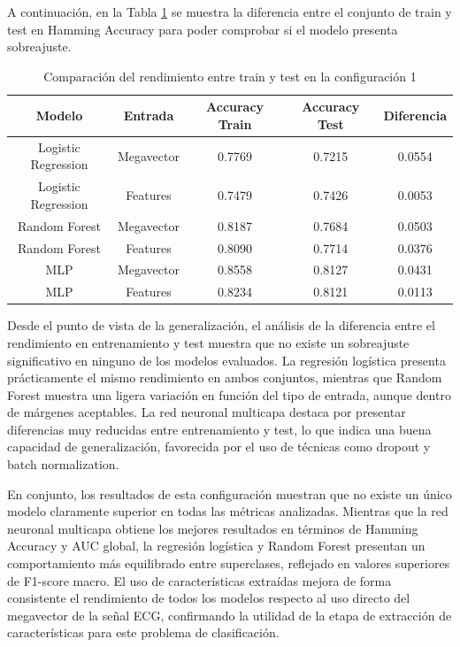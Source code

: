 \documentclass[12pt,a4paper,twoside]{book}
\begin{document}
A continuación, en la Tabla \ref{tab:overfitting_accuracy_config1} se muestra la diferencia entre el conjunto de train y test en Hamming Accuracy para poder comprobar si el modelo presenta sobreajuste.

\begin{table}[H]
	\centering
	\begin{tabular}{|c|c|c|c|c|}
	\hline
	\textbf{Modelo} & \textbf{Entrada} & \textbf{Accuracy Train} & \textbf{Accuracy Test} & \textbf{Diferencia} \\
	\hline

	Logistic Regression & Megavector & 0.7769 & 0.7215 & 0.0554 \\
	Logistic Regression & Features    & 0.7479 & 0.7426 & 0.0053 \\

	Random Forest & Megavector & 0.8187 & 0.7684 & 0.0503 \\
	Random Forest & Features    & 0.8090 & 0.7714 & 0.0376 \\

	MLP & Megavector & 0.8558 & 0.8127 & 0.0431 \\
	MLP & Features & 0.8234 & 0.8121 & 0.0113 \\

	\hline
	\end{tabular}
	\caption{Comparación del rendimiento entre train y test en la configuración 1}
	\label{tab:overfitting_accuracy_config1}
\end{table}

Desde el punto de vista de la generalización, el análisis de la diferencia entre el rendimiento en entrenamiento y test muestra que no existe un sobreajuste significativo en ninguno de los modelos evaluados. 
La regresión logística presenta prácticamente el mismo rendimiento en ambos conjuntos, mientras que Random Forest muestra una ligera variación en función del tipo de entrada, aunque dentro de márgenes aceptables. 
La red neuronal multicapa destaca por presentar diferencias muy reducidas entre entrenamiento y test, lo que indica una buena capacidad de generalización, favorecida por el uso de técnicas como dropout y batch normalization.

En conjunto, los resultados de esta configuración muestran que no existe un único modelo claramente superior en todas las métricas analizadas. 
Mientras que la red neuronal multicapa obtiene los mejores resultados en términos de Hamming Accuracy y AUC global, la regresión logística y Random Forest presentan un comportamiento más equilibrado entre superclases, reflejado en valores superiores de F1-score macro. 
El uso de características extraídas mejora de forma consistente el rendimiento de todos los modelos respecto al uso directo del megavector de la señal ECG, confirmando la utilidad de la etapa de extracción de características para este problema de clasificación.
\end{document}

